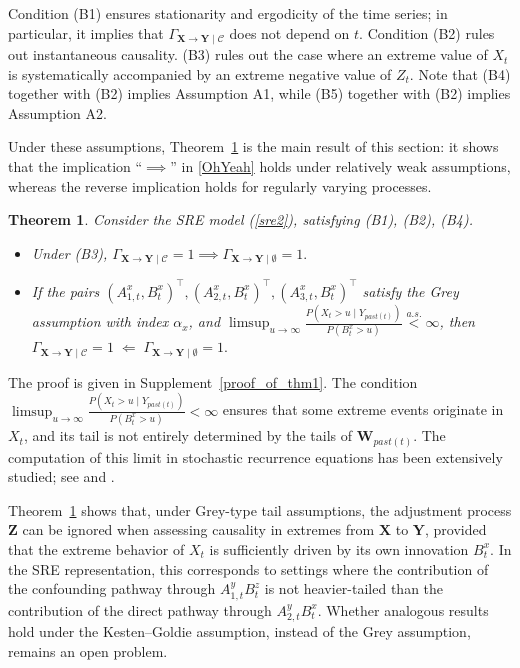 \documentclass[a4paper,11pt]{article}
\newtheorem{theorem}{Theorem}
\begin{document}
Condition (B1) ensures stationarity and ergodicity of the time series; in particular,
it implies that \(\Gamma_{\mathbf X\to\mathbf Y\mid\mathcal C}\) does not depend on \(t\). Condition (B2) rules out instantaneous causality. (B3) rules out the case where an extreme value of $X_t$ is systematically accompanied by an extreme negative value of $Z_t$.   Note that (B4) together with (B2) implies Assumption A1, while (B5) together with (B2) implies
Assumption A2.

Under these assumptions, Theorem~\ref{Theorem1} is the main result of this section:
it shows that the implication ``\(\implies\)'' in \eqref{OhYeah} holds under relatively
weak assumptions, whereas the reverse implication holds for regularly varying processes.

\begin{theorem}\label{Theorem1}
Consider the SRE model (\ref{sre2}), satisfying (B1), (B2), (B4). 
\begin{itemize}
    \item Under (B3), $\Gamma_{\textbf{X}\to\textbf{Y}\mid\mathcal{C}} = 1 \implies \Gamma_{\textbf{X}\to\textbf{Y}\mid \emptyset} = 1. $
\item If the pairs $(A^x_{1,t},B^x_t)^\top,(A^x_{2,t},B^x_t)^\top,(A^x_{3,t},B^x_t)^\top$ satisfy the Grey assumption with index $\alpha_x$, and $\limsup_{u\to\infty}\frac{P(X_t>u\mid Y_{past(t)})}{P(B_t^x>u)}\overset{a.s.}{<}\infty$, then $\Gamma_{\textbf{X}\to\textbf{Y}\mid\mathcal{C}} = 1 \;\Longleftarrow\; \Gamma_{\textbf{X}\to\textbf{Y}\mid \emptyset} = 1. $
\end{itemize}
\end{theorem}
The proof is given in Supplement~\ref{proof_of_thm1}. The condition
\(
\limsup_{u\to\infty}\frac{P(X_t>u\mid Y_{past(t)})}{P(B_t^x>u)}<\infty
\)
ensures that some extreme events originate in \(X_t\), and its tail is not entirely determined by the tails of
$\textbf{W}_{past(t)}$. The computation of this limit in stochastic recurrence equations has been extensively studied; see
\citet[Theorem~4.4.24]{SRE} and \cite{Ewa_Damek}.

Theorem~\ref{Theorem1} shows that, under Grey-type tail assumptions, the adjustment
process \(\mathbf Z\) can be ignored when assessing causality in extremes from
\(\mathbf X\) to \(\mathbf Y\), provided that the extreme behavior
of \(X_t\) is sufficiently driven by its own innovation \(B_t^x\). In the SRE representation, this corresponds to settings where the
contribution of the confounding pathway through \(A^y_{1,t}B_t^z\) is not heavier-tailed
than the contribution of the direct pathway through \(A^y_{2,t}B_t^x\). Whether analogous
results hold under the Kesten--Goldie assumption, instead of the Grey assumption, remains
an open problem.
\end{document}
